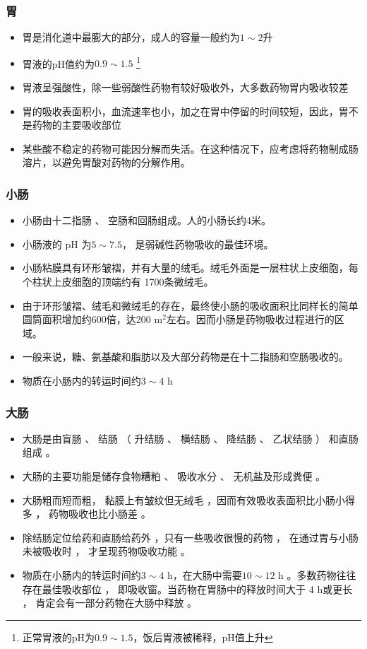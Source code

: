 \begin{frame}
    \frametitle{胃}
    \begin{itemize}
      \item 胃是消化道中最膨大的部分，成人的容量一般约为$1 \sim 2$升
      \item 胃液的pH值约为$0.9 \sim 1.5$ \footnote{正常胃液的pH为$0.9 \sim 1.5$，饭后胃液被稀释，pH值上升}
      \item 胃液呈强酸性，除一些弱酸性药物有较好吸收外，大多数药物胃内吸收较差
      \item 胃的吸收表面积小，血流速率也小，加之在胃中停留的时间较短，因此，胃不是药物的主要吸收部位
      \item 某些酸不稳定的药物可能因分解而失活。在这种情况下，应考虑将药物制成肠
      溶片，以避免胃酸对药物的分解作用。  
    \end{itemize}
\end{frame}


\begin{frame}
    \frametitle{小肠}
    \begin{itemize}
      \item 小肠由十二指肠 、 空肠和回肠组成。人的小肠长约4米。
      \item 小肠液的 pH 为$5 \sim 7.5$， 是弱碱性药物吸收的最佳环境。
      \item 小肠粘膜具有环形皱褶，并有大量的绒毛。绒毛外面是一层柱状上皮细胞，每个柱状上皮细胞的顶端约有 1700条微绒毛。
      \item 由于环形皱褶、绒毛和微绒毛的存在，最终使小肠的吸收面积比同样长的简单圆筒面积增加约600倍，达200 m$^2$左右。因而小肠是药物吸收过程进行的区域。
      \item 一般来说，糖、氨基酸和脂肪以及大部分药物是在十二指肠和空肠吸收的。
      \item 物质在小肠内的转运时间约$3 \sim 4$ h
    \end{itemize}
\end{frame}


\begin{frame}
    \frametitle{大肠}
    \begin{itemize}
      \item 大肠是由盲肠 、 结肠 （ 升结肠 、 横结肠 、 降结肠 、 乙状结肠 ） 和直肠组成 。
      \item 大肠的主要功能是储存食物糟粕 、 吸收水分 、 无机盐及形成粪便 。
      \item 大肠粗而短而粗， 黏膜上有皱纹但无绒毛 ，因而有效吸收表面积比小肠小得多 ， 药物吸收也比小肠差 。
      \item 除结肠定位给药和直肠给药外 ，只有一些吸收很慢的药物 ， 在通过胃与小肠未被吸收时 ， 才呈现药物吸收功能 。
      \item 物质在小肠内的转运时间约$3 \sim 4$ h，在大肠中需要$10 \sim 12$ h 。多数药物往往存在最佳吸收部位 ， 即吸收窗。当药物在胃肠中的释放时间大于 4 h或更长 ， 肯定会有一部分药物在大肠中释放 。
    \end{itemize}
\end{frame}


